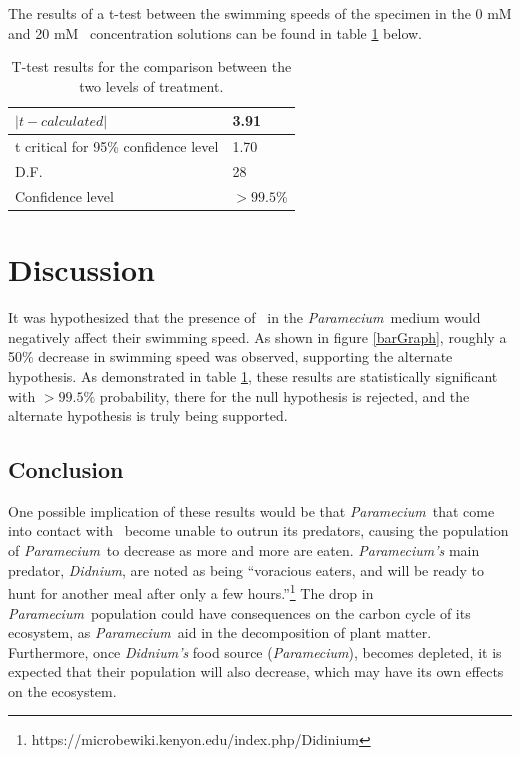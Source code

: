 \documentclass[12pt]{article}
\newcommand{\p}{\textit{Paramecium}}
\newcommand{\kcl}{\ce{KCl}}
\begin{document}
	The results of a t-test between the swimming speeds of the specimen in the 0 mM and 20 mM \kcl\ concentration solutions can be found in table \ref{t-test} below.\\
	
	\begin{table}[h]
		\centering
		\begin{tabular}{|l|l|} \hline
			$|t-calculated|$ & 3.91 \\ \hline
			t critical for 95\% confidence level & 1.70 \\ \hline
			D.F. & 28 \\ \hline
			Confidence level & $>99.5\%$ \\ \hline
		\end{tabular}
		\caption{T-test results for the comparison between the two levels of treatment.}
		\label{t-test}
	\end{table}
	
\section{Discussion}

It was hypothesized that the presence of \kcl\ in the \p\ medium would negatively affect their swimming speed. As shown in figure \ref{barGraph}, roughly a 50\% decrease in swimming speed
was observed, supporting the alternate hypothesis. As demonstrated in table \ref{t-test}, these results are statistically significant with $>99.5\%$ probability, there for the null hypothesis is rejected, and the alternate hypothesis is truly being supported.

\subsection{Conclusion}

One possible implication of these results would be that \p\ that come into contact with \kcl\ become unable to outrun its predators, causing the population of \p\ to decrease as more
and more are eaten. \textit{Paramecium's} main predator, \textit{Didnium}, are noted as being ``voracious eaters, and will be ready to hunt for another meal after only a few hours.''\footnote{https://microbewiki.kenyon.edu/index.php/Didinium} The drop in \p\ 
population could have consequences on the carbon cycle of its ecosystem, as \p\ aid in the decomposition of plant matter. Furthermore, once \textit{Didnium's} food source (\p), becomes depleted, it 
is expected that their population will also decrease, which may have its own effects on the ecosystem. 
\end{document}
